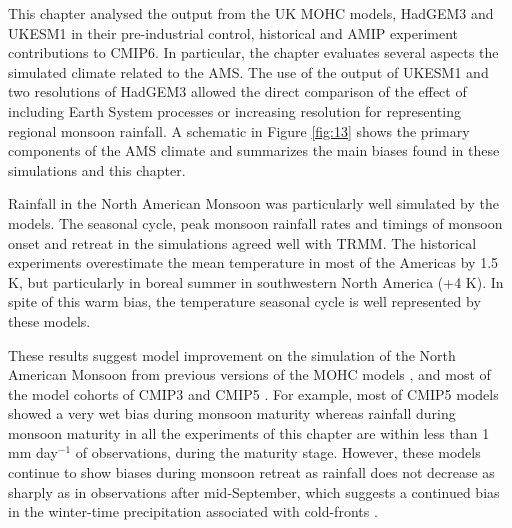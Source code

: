  This chapter analysed the output from the UK MOHC models, HadGEM3 and UKESM1 in their pre-industrial control, historical and AMIP experiment contributions to CMIP6. In particular, the chapter evaluates several aspects the simulated climate related to the AMS. The use of the output of UKESM1 and two resolutions of HadGEM3 allowed the direct comparison of the effect of including Earth System processes or increasing resolution for representing regional monsoon rainfall. 
A schematic in Figure \ref{fig:13} shows the primary components of the AMS climate and summarizes the main biases found in these simulations and this chapter.



Rainfall in the North American Monsoon was particularly well simulated by the models. The seasonal cycle, peak monsoon rainfall rates and timings of monsoon onset and retreat in the simulations agreed well with TRMM. The historical experiments overestimate the mean temperature in most of the Americas by 1.5 K, but particularly in boreal summer in southwestern North America (+4 K). In spite of this warm bias, the temperature seasonal cycle is well represented by these models. 

  These results suggest model improvement on the simulation of the North American Monsoon from previous versions of the MOHC models \citep{arritt2000}, and most of the model cohorts of CMIP3 and CMIP5 \citep{geil2013}. For example, most of CMIP5 models showed a very wet bias during monsoon maturity whereas rainfall during monsoon maturity in all the experiments of this chapter are within less than 1 mm day$^{-1}$ of observations, during the maturity stage. However, these models continue to show biases during monsoon retreat as rainfall does not decrease as sharply as in observations after mid-September, which suggests a continued bias in the winter-time precipitation associated with cold-fronts \citep{adams1997}. 

